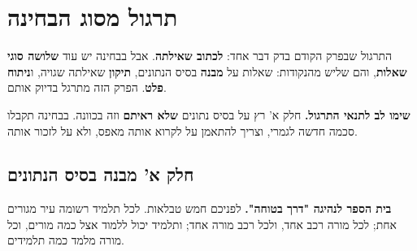 \documentclass[11pt,a4paper]{article}
\begin{document}
\newpage
\section{תרגול מסוג הבחינה}

התרגול שבפרק הקודם בדק דבר אחד: \textbf{לכתוב שאילתה}. אבל בבחינה יש עוד \textbf{שלושה סוגי שאלות}, והם שליש מהנקודות: שאלות על \textbf{מבנה} בסיס הנתונים, \textbf{תיקון} שאילתה שגויה, ו\textbf{ניתוח פלט}. הפרק הזה מתרגל בדיוק אותם.

\vspace{3pt}
\begin{panel}
\textbf{שימו לב לתנאי התרגול.} חלק א' רץ על בסיס נתונים \textbf{שלא ראיתם} \textendash{} וזה בכוונה. בבחינה תקבלו סכמה חדשה לגמרי, וצריך להתאמן על לקרוא אותה מאפס, ולא על לזכור אותה.
\end{panel}

\subsection{חלק א' \textendash{} מבנה בסיס הנתונים}

\textbf{בית הספר לנהיגה "דרך בטוחה".} לפניכם חמש טבלאות. לכל תלמיד רשומה עיר מגורים אחת; לכל מורה רכב אחד, ולכל רכב מורה אחד; ותלמיד יכול ללמוד אצל כמה מורים, וכל מורה מלמד כמה תלמידים.
\end{document}
